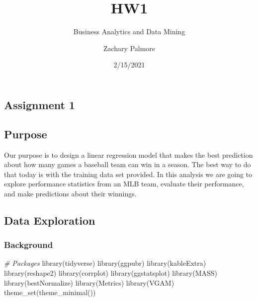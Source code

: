 \documentclass[
]{article}
\title{HW1}
\subtitle{Business Analytics and Data Mining}
\author{Zachary Palmore}
\date{2/15/2021}
\newenvironment{Shaded}{\begin{snugshade}}{\end{snugshade}}
\newcommand{\CommentTok}[1]{\textcolor[rgb]{0.56,0.35,0.01}{\textit{#1}}}
\newcommand{\FunctionTok}[1]{\textcolor[rgb]{0.00,0.00,0.00}{#1}}
\newcommand{\NormalTok}[1]{#1}
\begin{document}
\maketitle

\begin{center}

\hypertarget{assignment-1}{%
\section{Assignment 1}\label{assignment-1}}

\end{center}

\hypertarget{purpose}{%
\subsection{Purpose}\label{purpose}}

Our purpose is to design a linear regression model that makes the best
prediction about how many games a baseball team can win in a season. The
best way to do that today is with the training data set provided. In
this analysis we are going to explore performance statistics from an MLB
team, evaluate their performance, and make predictions about their
winnings.

\hypertarget{data-exploration}{%
\subsection{Data Exploration}\label{data-exploration}}

\hypertarget{background}{%
\subsubsection{Background}\label{background}}

\begin{Shaded}
\begin{Highlighting}[]
\CommentTok{\# Packages }
\FunctionTok{library}\NormalTok{(tidyverse)}
\FunctionTok{library}\NormalTok{(ggpubr)}
\FunctionTok{library}\NormalTok{(kableExtra)}
\FunctionTok{library}\NormalTok{(reshape2)}
\FunctionTok{library}\NormalTok{(corrplot)}
\FunctionTok{library}\NormalTok{(ggstatsplot)}
\FunctionTok{library}\NormalTok{(MASS)}
\FunctionTok{library}\NormalTok{(bestNormalize)}
\FunctionTok{library}\NormalTok{(Metrics)}
\FunctionTok{library}\NormalTok{(VGAM)}
\FunctionTok{theme\_set}\NormalTok{(}\FunctionTok{theme\_minimal}\NormalTok{())}
\end{Highlighting}
\end{Shaded}
\end{document}
